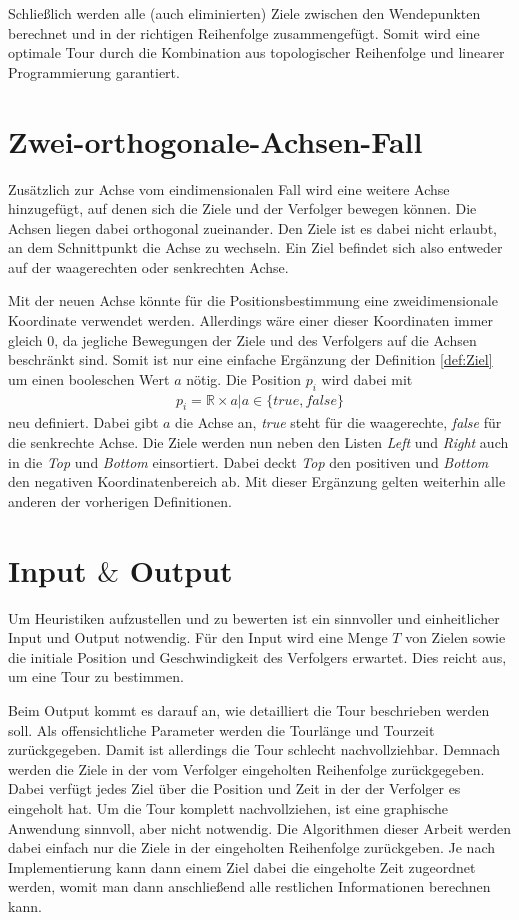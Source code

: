 \documentclass[german,version-2019-11]{uzl-thesis}
\begin{document}
Schließlich werden alle (auch eliminierten) Ziele zwischen den Wendepunkten berechnet und in der richtigen Reihenfolge zusammengefügt. Somit wird eine optimale Tour durch die Kombination aus topologischer Reihenfolge und linearer Programmierung garantiert.


\section{Zwei-orthogonale-Achsen-Fall}

Zusätzlich zur Achse vom eindimensionalen Fall wird eine weitere Achse hinzugefügt, auf denen sich die Ziele und der Verfolger bewegen können. Die Achsen liegen dabei orthogonal zueinander. Den Ziele ist es dabei nicht erlaubt, an dem Schnittpunkt die Achse zu wechseln. Ein Ziel befindet sich also entweder auf der waagerechten oder senkrechten Achse. 

Mit der neuen Achse könnte für die Positionsbestimmung eine zweidimensionale Koordinate verwendet werden. Allerdings wäre einer dieser Koordinaten immer gleich $0$, da jegliche Bewegungen der Ziele und des Verfolgers auf die Achsen beschränkt sind. Somit ist nur eine einfache Ergänzung der Definition \ref{def:Ziel} um einen booleschen Wert $a$ nötig. Die Position $p_i$ wird dabei mit 
\begin{align*}
p_i = \mathbb{R} \times a | a\in \{true, false\}
\end{align*}
neu definiert. Dabei gibt $a$ die Achse an, \emph{true} steht für die waagerechte, \emph{false} für die senkrechte Achse. Die Ziele werden nun neben den Listen \emph{Left} und \emph{Right} auch in die \emph{Top} und \emph{Bottom} einsortiert. Dabei deckt \emph{Top} den positiven und \emph{Bottom} den negativen Koordinatenbereich ab. Mit dieser Ergänzung gelten weiterhin alle anderen der vorherigen Definitionen.

\section{Input $\&$ Output}

Um Heuristiken aufzustellen und zu bewerten ist ein sinnvoller und einheitlicher Input und Output notwendig. Für den Input wird eine Menge $T$ von Zielen sowie die initiale Position und Geschwindigkeit des Verfolgers erwartet. Dies reicht aus, um eine Tour zu bestimmen. 

Beim Output kommt es darauf an, wie detailliert die Tour beschrieben werden soll. Als offensichtliche Parameter werden die Tourlänge und Tourzeit zurückgegeben. Damit ist allerdings die Tour schlecht nachvollziehbar. Demnach werden die Ziele in der vom Verfolger eingeholten Reihenfolge zurückgegeben. Dabei verfügt jedes Ziel über die Position und Zeit in der der Verfolger es eingeholt hat. Um die Tour komplett nachvollziehen, ist eine graphische Anwendung sinnvoll, aber nicht notwendig. 
Die Algorithmen dieser Arbeit werden dabei einfach nur die Ziele in der eingeholten Reihenfolge zurückgeben. Je nach Implementierung kann dann einem Ziel dabei die eingeholte Zeit zugeordnet werden, womit man dann anschließend alle restlichen Informationen berechnen kann. 
\end{document}

